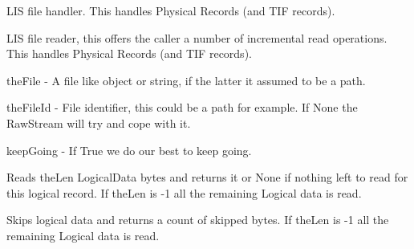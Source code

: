 \documentclass[letterpaper,10pt,english]{sphinxmanual}
\begin{document}

\begin{fulllineitems}
\label{\detokenize{ref/LIS/core/File:TotalDepth.LIS.core.File.FileBase}}
LIS file handler. This handles Physical Records (and TIF records).

\end{fulllineitems}


\begin{fulllineitems}
\label{\detokenize{ref/LIS/core/File:TotalDepth.LIS.core.File.FileRead}}
LIS file reader, this offers the caller a number of incremental
read operations. This handles Physical Records (and TIF records).

theFile - A file like object or string, if the latter it assumed to be a path.

theFileId - File identifier, this could be a path for example. If None the RawStream will try and cope with it.

keepGoing - If True we do our best to keep going.

\begin{fulllineitems}
\label{\detokenize{ref/LIS/core/File:TotalDepth.LIS.core.File.FileRead.readLrBytes}}
Reads theLen LogicalData bytes and returns it or None if nothing
left to read for this logical record.
If theLen is -1 all the remaining Logical data is read.

\end{fulllineitems}


\begin{fulllineitems}
\label{\detokenize{ref/LIS/core/File:TotalDepth.LIS.core.File.FileRead.skipLrBytes}}
Skips logical data and returns a count of skipped bytes.
If theLen is -1 all the remaining Logical data is read.


\end{fulllineitems}
\end{fulllineitems}
\end{document}
